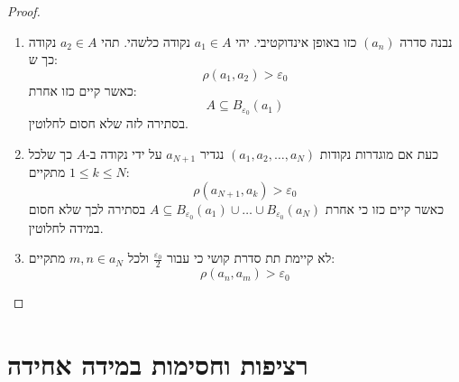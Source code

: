 \documentclass{tstextbook}
\begin{document}
\begin{proof}
\begin{enumerate}
    \item נבנה סדרה \((a_{n})\) כזו באופן אינדוקטיבי. יהי \(a_{1} \in A\) נקודה כלשהי. תהי \(a_{2} \in A\) נקודה כך ש: 
$$\rho(a_{1},a_{2})>\varepsilon_{0}$$
כאשר קיים כזו אחרת:
$$A\subseteq B_{\varepsilon_{0}}(a_{1})$$
בסתירה לזה שלא חסום לחלוטין.


    \item כעת אם מוגדרות נקודות \((a_{1},a_{2},\dots,a_{N})\) נגדיר \(a_{N+1}\) על ידי נקודה ב-\(A\) כך שלכל \(1\leq k\leq N\) מתקיים: 
$$\rho(a_{N+1},a_{k})> \varepsilon_{0}$$
כאשר קיים כזו כי אחרת \(A\subseteq{ B_{\varepsilon_{0}}(a_{1}) }\cup \dots \cup {  B_{\varepsilon_{0}}(a_{N}) }\) בסתירה לכך שלא חסום במידה לחלוטין.


    \item לא קיימת תת סדרת קושי כי עבור \(\frac{\varepsilon_{0}}{2}\) ולכל \(m,n \in a_{N}\) מתקיים: 
$$\rho(a_{n},a_{m})>\varepsilon_{0}$$


  \end{enumerate}
\end{proof}
\section{רציפות וחסימות במידה אחידה}
\end{document}
